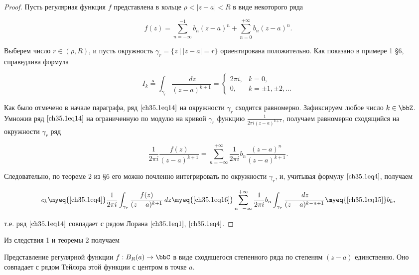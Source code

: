 \begin{proof}
Пусть регулярная функция $f$ представлена в кольце $\rho < |z - a| < R$ в виде некоторого ряда

\begin{equation} \label{ch35.1eq14}
f(z) = \sum_{n = -\infty}^{-1} b_n (z - a)^n + \sum_{n = 0}^{+\infty} b_n (z - a)^n.
\end{equation}

Выберем число $r \in (\rho, R)$, и пусть окружность $\gamma_r = \{ z \: \big| \: |z - a| = r\}$ ориентирована положительно. Как показано в примере 1 \S 6, справедлива формула

\begin{equation} \label{ch35.1eq15}
I_k \triangleq \int_{\gamma_r} \frac{\,dz}{(z - a)^{k + 1}} = 
\begin{cases}
2\pi i, & k = 0, \\
0, & k = \pm1, \pm2, \ldots
\end{cases}
\end{equation}

Как было отмечено в начале параграфа, ряд $\eqref{ch35.1eq14}$ на окружности $\gamma_r$ сходится равномерно. Зафиксируем любое число $k \in \bbZ$. Умножив ряд $\eqref{ch35.1eq14}$ на ограниченную по модулю на кривой $\gamma_r$ функцию $\frac{1}{2\pi i(z - a)^{k + 1}}$, получаем равномерно сходящийся на окружности $\gamma_r$ ряд

\begin{equation} \label{ch35.1eq16}
\frac{1}{2\pi i} \frac{f(z)}{(z - a)^{k + 1}} = \sum_{n = -\infty}^{+\infty} \frac{1}{2\pi i} b_n \frac{(z-a)^n}{(z - a)^{k + 1}}.
\end{equation}

Следовательно, по теореме 2 из \S 6 его можно почленно интегрировать по окружности $\gamma_r$, и, учитывая формулу $\eqref{ch35.1eq4}$, получаем

$$
c_k \myeq{\eqref{ch35.1eq4}} \frac{1}{2\pi i} \int_{\gamma_r} \frac{f(z)}{(z - a)^{k + 1}} \,dz \myeq{\eqref{ch35.1eq16}} \sum_{n = -\infty}^{+\infty} \frac{1}{2\pi i} b_n \int_{\gamma_r} \frac{\,dz}{(z - a)^{k - n + 1}} \myeq{\eqref{ch35.1eq15}} b_k,
$$

т.е. ряд $\eqref{ch35.1eq14}$ совпадает с рядом Лорана $\eqref{ch35.1eq1}$, $\eqref{ch35.1eq4}$.

\end{proof}

Из следствия 1 и теоремы 2 получаем

\begin{cons}
Представление регулярной функции $f : B_R(a) \to \bbC$ в виде сходящегося степенного ряда по степеням $(z - a)$ единственно. Оно совпадает с рядом Тейлора этой функции с центром в точке $a$.
\end{cons}

